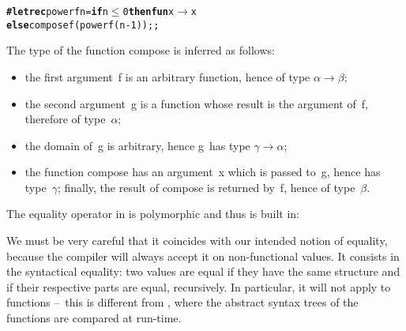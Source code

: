 \noindent{}
\begin{alltt}
\textbf{\# let rec} power f n = \textbf{if} n \(\leqslant\) 0 \textbf{then fun} x \(\rightarrow\) x
                                \textbf{else} compose f (power f (n-1));;
\end{alltt}
\vspace{-4mm}
\noindent{}

\bigskip

\noindent The type of the function \textsf{compose} is inferred as follows:
\begin{itemize}

  \item the first argument~\textsf{f} is an arbitrary function, hence
    of type \(\alpha \rightarrow \beta\);

  \item the second argument~\textsf{g} is a function whose result is
    the argument of~\textsf{f}, therefore of type~\(\alpha\);

  \item the domain of~\textsf{g} is arbitrary, hence \textsf{g}~has
    type \(\gamma \rightarrow \alpha\);

  \item the function \textsf{compose} has an argument~\textsf{x} which
    is passed to~\textsf{g}, hence has type~\(\gamma\); finally, the
    result of \textsf{compose} is returned by~\textsf{f}, hence of
    type~\(\beta\).

\end{itemize}
\noindent The equality operator in \OCaml is polymorphic and thus is
built in:

\noindent\topin{(=)}

\noindent{}

\bigskip

\noindent We must be very careful that it coincides with our
intended notion of equality, because the compiler will always accept
it on non\hyp{}functional values. It consists in the syntactical
equality: two values are equal if they have the same structure and if
their respective parts are equal, recursively. In particular, it will
not apply to functions --~this is different from
\Erlang, where the abstract syntax trees of the functions are compared
at run\hyp{}time.

